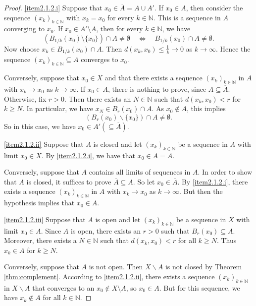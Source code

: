\documentclass[a4paper,reqno]{amsart}
\numberwithin{equation}{section}
\def\N{\mathbb{N}}
\begin{document}
\begin{proof}
\eqref{item2.1.2.i} Suppose that $x_0 \in \overline{A}= A \cup A'$. If $x_0 \in A$, then consider the sequence $(x_k)_{k \in \N}$ with
$x_k = x_0$ for every $k \in \N$. This is a sequence in $A$ converging to $x_0$. If $x_0 \in A'\setminus A$,
then for every $k \in \N$, we have
\[
(B_{1/k}(x_0)\setminus\{x_0\}) \cap A \not= \emptyset \quad \Leftrightarrow \quad B_{1/k}(x_0) \cap A \not= \emptyset.
\]
Now choose $x_k \in B_{1/k}(x_0) \cap A$. Then $d(x_k,x_0) \le \frac{1}{k} \to 0$ as $k \to \infty$.
Hence the sequence $(x_k)_{k \in \N}\subseteq A$ converges to $x_0$.

Conversely, suppose that $x_0 \in X$ and that there exists a sequence $(x_k)_{k \in \N}$ in $A$
with $x_k \to x_0$ as $k \to \infty$. If $x_0 \in A$, there is nothing to prove, since $A\subseteq \overline{A}$. Otherwise,
fix $r > 0$. Then there exists an $N \in \N$ such that $d(x_k,x_0) < r$ for $k \ge N$.
In particular, we have $x_N \in B_r(x_0) \cap A$. As $x_0 \not\in A$, this implies
\[
\left(B_r(x_0) \backslash \{x_0\}\right) \cap A \not= \emptyset.
\]
So in this case, we have $x_0 \in A' (\subseteq \overline A)$.

\eqref{item2.1.2.ii} Suppose that $A$ is closed and let $(x_k)_{k \in \N}$ be a sequence
in $A$ with limit $x_0 \in X$. By \eqref{item2.1.2.i}, we have that $x_0 \in \overline{A} = A$.

Conversely, suppose that $A$ contains all limits of sequences in $A$. In order to show
that $A$ is closed, it suffices to prove $\overline{A} \subseteq A$. So let $x_0 \in \overline{A}$.
By \eqref{item2.1.2.i}, there exists a sequence $(x_k)_{k \in \N}$ in $A$ with $x_k \to x_0$
as $k \to \infty$. But then the hypothesis implies that $x_0 \in A$.

\eqref{item2.1.2.iii} Suppose that $A$ is open and let $(x_k)_{k \in \N}$ be a sequence in $X$
with limit $x_0 \in A$. Since $A$ is open, there exists an $r > 0$ such that $B_r(x_0) \subseteq A$.
Moreover, there exists a $N \in \N$ such that $d(x_k,x_0) < r$ for all $k \ge N$.
Thus $x_k \in A$ for $k \ge N$.

Conversely, suppose that $A$ is not open. Then $X \backslash A$ is not closed
by Theorem \ref{thm:complement}. According to \eqref{item2.1.2.ii}, there exists
a sequence $(x_k)_{k \in \N}$ in $X \backslash A$ that converges to an $x_0 \notin X\setminus A$, so $x_0\in A$.
But for this sequence, we have $x_k \not\in A$ for all $k \in \N$.
\end{proof}



\end{document}
